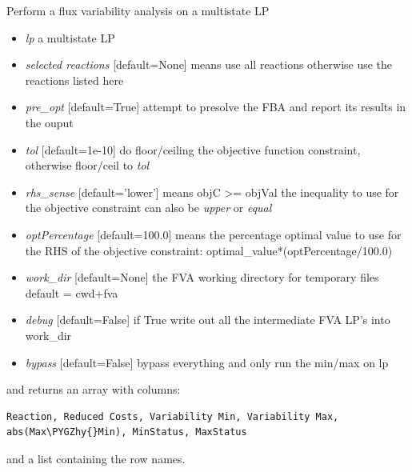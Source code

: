 \documentclass[a4paper,11pt,english]{sphinxmanual}
\def\PYGZhy{\char`\-}
\begin{document}
\begin{fulllineitems}
\label{modules_doc:cbmpy.CBCPLEX.cplx_MultiFluxVariabilityAnalysis}
Perform a flux variability analysis on a multistate LP
\begin{itemize}
\item {} 
\emph{lp} a multistate LP

\item {} 
\emph{selected reactions} {[}default=None{]} means use all reactions otherwise use the reactions listed here

\item {} 
\emph{pre\_opt} {[}default=True{]} attempt to presolve the FBA and report its results in the ouput

\item {} 
\emph{tol}  {[}default=1e-10{]} do floor/ceiling the objective function constraint, otherwise floor/ceil to \emph{tol}

\item {} 
\emph{rhs\_sense} {[}default='lower'{]} means objC \textgreater{}= objVal the inequality to use for the objective constraint can also be \emph{upper} or \emph{equal}

\item {} 
\emph{optPercentage} {[}default=100.0{]} means the percentage optimal value to use for the RHS of the objective constraint: optimal\_value*(optPercentage/100.0)

\item {} 
\emph{work\_dir} {[}default=None{]} the FVA working directory for temporary files default = cwd+fva

\item {} 
\emph{debug} {[}default=False{]} if True write out all the intermediate FVA LP's into work\_dir

\item {} 
\emph{bypass} {[}default=False{]} bypass everything and only run the min/max on lp

\end{itemize}

and returns an array with columns:

\begin{Verbatim}[commandchars=\\\{\}]
Reaction, Reduced Costs, Variability Min, Variability Max, abs(Max\PYGZhy{}Min), MinStatus, MaxStatus
\end{Verbatim}

and a list containing the row names.

\end{fulllineitems}
\end{document}
